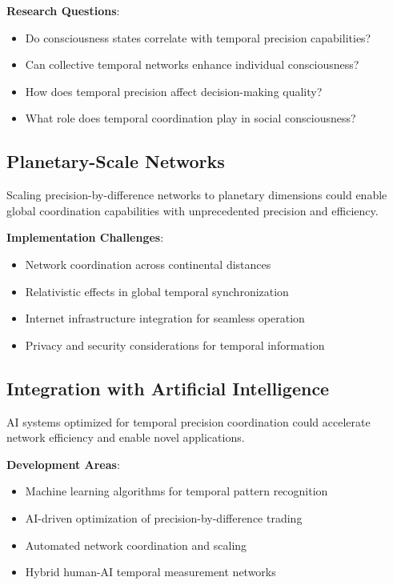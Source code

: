 \documentclass[12pt,a4paper]{article}
\begin{document}
\textbf{Research Questions}:
\begin{itemize}
\item Do consciousness states correlate with temporal precision capabilities?
\item Can collective temporal networks enhance individual consciousness?
\item How does temporal precision affect decision-making quality?
\item What role does temporal coordination play in social consciousness?
\end{itemize}

\subsection{Planetary-Scale Networks}

Scaling precision-by-difference networks to planetary dimensions could enable global coordination capabilities with unprecedented precision and efficiency.

\textbf{Implementation Challenges}:
\begin{itemize}
\item Network coordination across continental distances
\item Relativistic effects in global temporal synchronization
\item Internet infrastructure integration for seamless operation
\item Privacy and security considerations for temporal information
\end{itemize}

\subsection{Integration with Artificial Intelligence}

AI systems optimized for temporal precision coordination could accelerate network efficiency and enable novel applications.

\textbf{Development Areas}:
\begin{itemize}
\item Machine learning algorithms for temporal pattern recognition
\item AI-driven optimization of precision-by-difference trading
\item Automated network coordination and scaling
\item Hybrid human-AI temporal measurement networks
\end{itemize}
\end{document}
